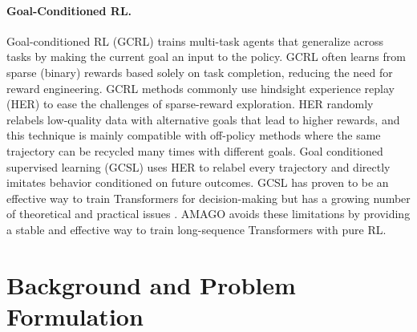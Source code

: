 \documentclass{article}
\begin{document}
\paragraph{Goal-Conditioned RL.} Goal-conditioned RL (GCRL) \cite{kaelbling1993learning, pong2021goal} trains multi-task agents that generalize across tasks by making the current goal an input to the policy. GCRL often learns from sparse (binary) rewards based solely on task completion, reducing the need for reward engineering. GCRL methods commonly use hindsight experience replay (HER) \cite{andrychowicz2017hindsight, nair2018visual, nasiriany2021disco, eysenbach2020rewriting} to ease the challenges of sparse-reward exploration. HER randomly relabels low-quality data with alternative goals that lead to higher rewards, and this technique is mainly compatible with off-policy methods where the same trajectory can be recycled many times with different goals. Goal conditioned supervised learning (GCSL) \cite{ghosh2019learning, mandlekar2020iris, lynch2020learning, kumar2019reward, schmidhuber2019reinforcement, srivastava2019training} uses HER to relabel every trajectory and directly imitates behavior conditioned on future outcomes. GCSL has proven to be an effective way to train Transformers for decision-making \cite{janner2021reinforcement, chen2021decision, zheng2022online, lee2022multi, cui2022play, xu2022prompting} but has a growing number of theoretical and practical issues \cite{eysenbach2022imitating, paster2022you, brandfonbrener2022does, yang2022rethinking}. AMAGO avoids these limitations by providing a stable and effective way to train long-sequence Transformers with pure RL.
\section{Background and Problem Formulation}
\label{sec:background}
\end{document}
